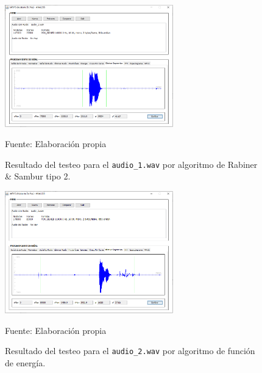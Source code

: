 \begin{figure}[H]
\begin{center}
\includegraphics[width=0.65\textwidth]{Imagenes/Cap3/image073}
\end{center}
\begin{center}
\vskip -0.5cm
\caption{\small{Resultado del testeo para el \texttt{audio\_1.wav} por algoritmo de Rabiner \& Sambur tipo 2.}}
\label{fig:figura3.73}
{\small{Fuente: Elaboración propia}}
\end{center}
\end{figure}

\vskip -1cm

\begin{figure}[H]
\begin{center}
\includegraphics[width=0.65\textwidth]{Imagenes/Cap3/image074}
\end{center}
\begin{center}
\vskip -0.5cm
\caption{\small{Resultado del testeo para el \texttt{audio\_2.wav} por algoritmo de función de energía.}}
\label{fig:figura3.74}
{\small{Fuente: Elaboración propia}}
\end{center}
\end{figure}

